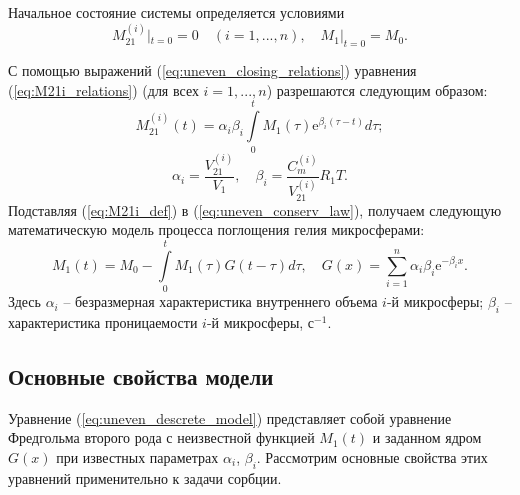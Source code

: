 Начальное состояние системы определяется условиями
\[
M_{21}^{(i)}|_{t=0} =0 \quad (i=1,...,n),\quad M_1|_{t=0} = M_0.
\]


С помощью выражений (\ref{eq:uneven_closing_relations}) уравнения (\ref{eq:M21i_relations}) (для всех $i=1,...,n$) разрешаются следующим образом:
\begin{equation}
\label{eq:M21i_def}
M_{21}^{(i)}(t)=\alpha_i\beta_i\int\limits_{0}^{t}M_1(\tau) \mathrm{e}^{\beta_i (\tau-t)} d\tau;
\end{equation}
\begin{equation}
\label{eq:uneven_alpha_beta_def}
\alpha_i = \frac{V_{21}^{(i)}}{V_1},\quad \beta_i = \frac{C_m^{(i)}}{V_{21}^{(i)}}R_1T.
\end{equation}
Подставляя (\ref{eq:M21i_def}) в (\ref{eq:uneven_conserv_law}), получаем следующую математическую модель процесса поглощения гелия микросферами:
\begin{equation}
\label{eq:uneven_descrete_model}
M_1(t)=M_0-\int\limits_{0}^{t}  M_1(\tau)  G(t-\tau) d\tau, \quad
G(x) = \sum\limits_{i=1}^{n}\alpha_i \beta_i  \mathrm{e}^{-\beta_i x}.
\end{equation}
Здесь $\alpha_i$ -- безразмерная характеристика внутреннего объема $i$-й микросферы; $\beta_i$ -- характеристика проницаемости $i$-й микросферы, с$^{-1}$.


\subsection{Основные свойства модели}

Уравнение (\ref{eq:uneven_descrete_model}) представляет собой уравнение Фредгольма второго рода с неизвестной функцией $M_1(t)$ и заданном ядром $G(x)$ при известных параметрах $\alpha_i$, $\beta_i$. Рассмотрим основные свойства этих уравнений применительно к задачи сорбции.


